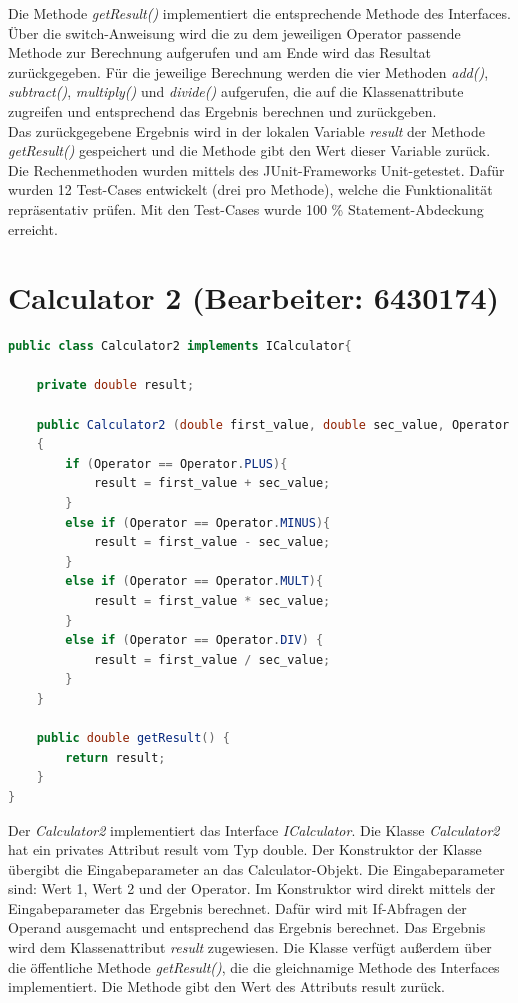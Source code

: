 Die Methode \textit{getResult()} implementiert die entsprechende Methode des Interfaces.
Über die switch-Anweisung wird die zu dem jeweiligen Operator passende Methode zur Berechnung aufgerufen und am Ende wird das Resultat zurückgegeben.
Für die jeweilige Berechnung werden die vier Methoden \textit{add()}, \textit{subtract()}, \textit{multiply()} und \textit{divide()} aufgerufen, die auf die Klassenattribute zugreifen und entsprechend das Ergebnis berechnen und zurückgeben.\\
Das zurückgegebene Ergebnis wird in der lokalen Variable \textit{result} der Methode \textit{getResult()} gespeichert und die Methode gibt den Wert dieser Variable zurück.\\
Die Rechenmethoden wurden mittels des JUnit-Frameworks Unit-getestet. Dafür wurden 12 Test-Cases entwickelt (drei pro Methode), welche die Funktionalität repräsentativ prüfen. Mit den Test-Cases wurde 100 \% Statement-Abdeckung erreicht.
\chapter{Calculator 2 (Bearbeiter: 6430174)}
\begin{lstlisting}[language=Java,basicstyle=\scriptsize, caption= Calculator 2]
public class Calculator2 implements ICalculator{

    private double result;

    public Calculator2 (double first_value, double sec_value, Operator Operator)
    {
        if (Operator == Operator.PLUS){
            result = first_value + sec_value;
        }
        else if (Operator == Operator.MINUS){
            result = first_value - sec_value;
        }
        else if (Operator == Operator.MULT){
            result = first_value * sec_value;
        }
        else if (Operator == Operator.DIV) {
            result = first_value / sec_value;
        }
    }

    public double getResult() {
        return result;
    }
}
\end{lstlisting}
Der \textit{Calculator2} implementiert das Interface \textit{ICalculator}. Die Klasse \textit{Calculator2} hat ein privates Attribut result vom Typ double. 
Der Konstruktor der Klasse übergibt die Eingabeparameter an das Calculator-Objekt. Die Eingabeparameter sind: Wert 1, Wert 2 und der Operator. Im Konstruktor wird direkt mittels der Eingabeparameter das Ergebnis berechnet. Dafür wird mit If-Abfragen der Operand ausgemacht und entsprechend das Ergebnis berechnet. Das Ergebnis wird dem Klassenattribut \textit{result} zugewiesen.
Die Klasse verfügt außerdem über die öffentliche Methode \textit{getResult()}, die die gleichnamige Methode des Interfaces implementiert. Die Methode gibt den Wert des Attributs result zurück.

